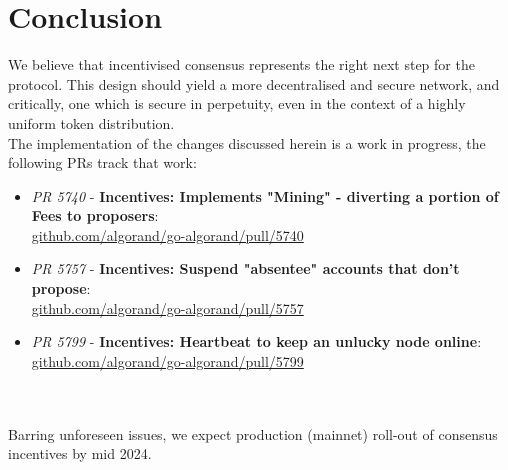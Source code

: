 \documentclass[11pt,a4paper]{article}
\begin{document}
\pagebreak

\section{Conclusion}
We believe that incentivised consensus represents the right next step for the protocol. This design should yield a more 
decentralised and secure network, and critically, one which is secure in perpetuity, even in the context of a highly 
uniform token distribution. \\ 

The implementation of the changes discussed herein is a work in progress, the following PRs track that work:


\begin{itemize}
    \item \emph{PR 5740} - \textbf{Incentives: Implements "Mining" - diverting a portion of Fees to proposers}:\\
          \href{https://github.com/algorand/go-algorand/pull/5740}{github.com/algorand/go-algorand/pull/5740} \\
    \item \emph{PR 5757} - \textbf{Incentives: Suspend "absentee" accounts that don't propose}:\\
          \href{https://github.com/algorand/go-algorand/pull/5757}{github.com/algorand/go-algorand/pull/5757} \\
    \item \emph{PR 5799} - \textbf{Incentives: Heartbeat to keep an unlucky node online}:\\
          \href{https://github.com/algorand/go-algorand/pull/5799}{github.com/algorand/go-algorand/pull/5799}
\end{itemize} \mbox{} \\ \\ 


Barring unforeseen issues, we expect production (mainnet) roll-out of consensus incentives by mid 2024.

\pagebreak

\printglossaries

\pagebreak
\end{document}
